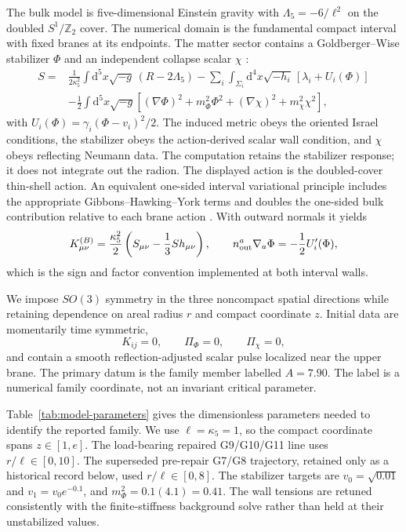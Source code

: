 \documentclass[11pt]{article}
\newcommand{\dd}{\mathrm{d}}
\begin{document}
The bulk model is five-dimensional Einstein gravity with
$\Lambda_5=-6/\ell^2$ on the doubled $S^1/\mathbb{Z}_2$ cover.  The numerical
domain is the fundamental compact interval with fixed branes at its endpoints.
The matter sector contains a Goldberger--Wise stabilizer $\Phi$ and an
independent collapse scalar $\chi$
\cite{RandallSundrum1999,GoldbergerWise1999,DeWolfeFreedmanGubserKarch2000,TanahashiTanaka2011}:
\begin{align}
S={}&\frac{1}{2\kappa_5^2}\int\dd^5x\sqrt{-g}\,(R-2\Lambda_5)
-\sum_i\int_{\Sigma_i}\dd^4x\sqrt{-h_i}\,[\lambda_i+U_i(\Phi)]
\nonumber\\
&-\frac12\int\dd^5x\sqrt{-g}\left[(\nabla\Phi)^2+m_\Phi^2\Phi^2
+(\nabla\chi)^2+m_\chi^2\chi^2\right],
\end{align}
with $U_i(\Phi)=\gamma_i(\Phi-v_i)^2/2$.  The induced metric obeys the
oriented Israel conditions, the stabilizer obeys the action-derived scalar
wall condition, and $\chi$ obeys reflecting Neumann data.  The computation
retains the stabilizer response; it does not integrate out the radion.
The displayed action is the doubled-cover thin-shell action.  An equivalent
one-sided interval variational principle includes the appropriate
Gibbons--Hawking--York terms and doubles the one-sided bulk contribution
relative to each brane action
\cite{Israel1966,GibbonsHawking1977,BattyeCarter2001}.  With outward normals it yields
\begin{equation}
K^{(B)}_{\mu\nu}=\frac{\kappa_5^2}{2}
\left(S_{\mu\nu}-\frac13 S h_{\mu\nu}\right),
\qquad n^a_{\rm out}\nabla_a\Phi=-\frac12 U_i'(\Phi),
\end{equation}
which is the sign and factor convention implemented at both interval walls.

We impose $SO(3)$ symmetry in the three noncompact spatial directions while
retaining dependence on areal radius $r$ and compact coordinate $z$.  Initial
data are momentarily time symmetric,
\begin{equation}
K_{ij}=0,\qquad \Pi_\Phi=0,\qquad \Pi_\chi=0,
\end{equation}
and contain a smooth reflection-adjusted scalar pulse localized near the upper
brane.  The primary datum is the family member labelled $A=7.90$.  The label is
a numerical family coordinate, not an invariant critical parameter.

Table~\ref{tab:model-parameters} gives the dimensionless parameters needed to
identify the reported family.  We use $\ell=\kappa_5=1$, so the compact
coordinate spans $z\in[1,e]$.  The load-bearing repaired G9/G10/G11 line uses
$r/\ell\in[0,10]$.  The superseded pre-repair G7/G8 trajectory, retained only
as a historical record below, used $r/\ell\in[0,8]$.
The stabilizer targets are $v_0=\sqrt{0.01}$ and
$v_1=v_0e^{-0.1}$, and $m_\Phi^2=0.1(4.1)=0.41$.  The wall tensions are
retuned consistently with the finite-stiffness background solve rather than
held at their unstabilized values.
\end{document}
